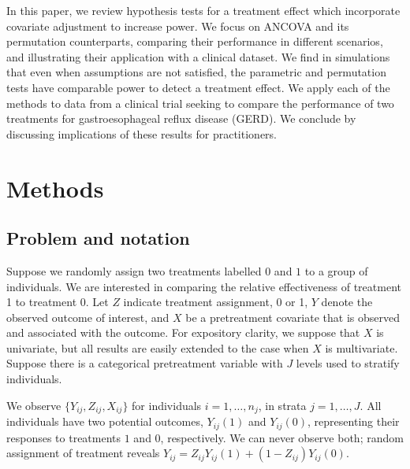 \documentclass[11pt]{article}
\newcommand{\todo}[1]{{\color{red}{TO DO: \sc #1}}}
\begin{document}
In this paper, we review hypothesis tests for a treatment effect which incorporate covariate adjustment to increase power.  
We focus on ANCOVA and its permutation counterparts, comparing their performance in different scenarios, and illustrating their application with a clinical dataset.
We find in simulations that even when assumptions are not satisfied, the parametric and permutation tests have comparable power to detect a treatment effect.
We apply each of the methods to data from a clinical trial seeking to compare the performance of two treatments for gastroesophageal reflux disease (GERD).
We conclude by discussing implications of these results for practitioners.

\section{Methods}


\subsection{Problem and notation \todo{what do others call this?}}
Suppose we randomly assign two treatments labelled $0$ and $1$ to a group of individuals.
We are interested in comparing the relative effectiveness of treatment 1 to treatment 0.
Let $Z$ indicate treatment assignment, 0 or 1, 
$Y$ denote the observed outcome of interest,
and $X$ be a pretreatment covariate that is observed and associated with the outcome.
For expository clarity, we suppose that $X$ is univariate, but all results are easily extended to the case when $X$ is multivariate.
Suppose there is a categorical pretreatment variable with $J$ levels used to stratify individuals. 

We observe $\{Y_{ij}, Z_{ij}, X_{ij}\}$ for individuals $i = 1, \dots, n_j$, in strata $j = 1, \dots, J$.
All individuals have two potential outcomes, $Y_{ij}(1)$ and $Y_{ij}(0)$, representing their responses to treatments $1$ and $0$, respectively.
We can never observe both; random assignment of treatment reveals $Y_{ij} = Z_{ij}Y_{ij}(1) + (1-Z_{ij})Y_{ij}(0)$.
\end{document}
